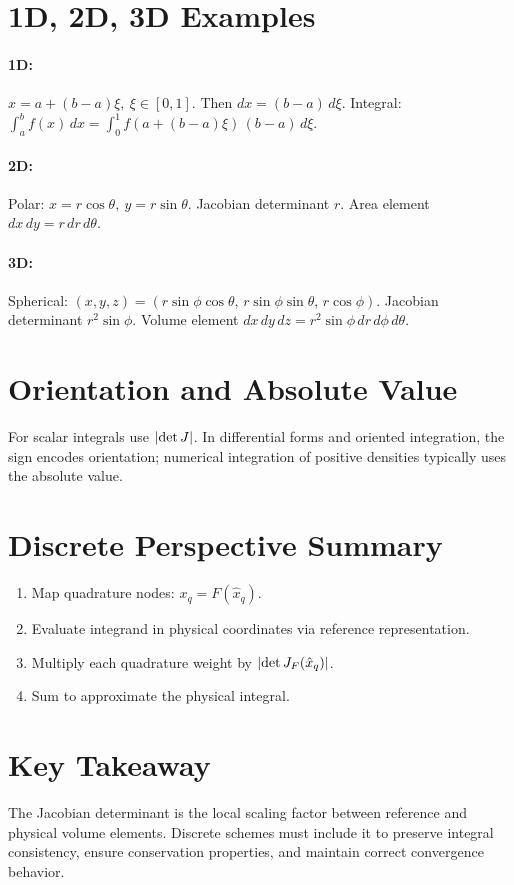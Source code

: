 \documentclass[11pt]{article}
\begin{document}
\section{1D, 2D, 3D Examples}
\paragraph{1D:} \( x = a + (b-a)\xi,\ \xi\in[0,1]. \) Then \( dx = (b-a)\, d\xi \). Integral:
\(
\int_a^b f(x)\, dx = \int_0^1 f(a+(b-a)\xi)\, (b-a)\, d\xi.
\)

\paragraph{2D:} Polar: \( x = r\cos\theta,\ y = r\sin\theta\). Jacobian determinant \( r\). Area element \( dx\,dy = r\, dr\, d\theta\).

\paragraph{3D:} Spherical: \( (x,y,z)= (r\sin\phi\cos\theta,\, r\sin\phi\sin\theta,\, r\cos\phi)\). Jacobian determinant \( r^2 \sin\phi\). Volume element \( dx\,dy\,dz = r^2 \sin\phi\, dr\, d\phi\, d\theta\).

\section{Orientation and Absolute Value}
For scalar integrals use \(\abs{\det J}\). In differential forms and oriented integration, the sign encodes orientation; numerical integration of positive densities typically uses the absolute value.

\section{Discrete Perspective Summary}
\begin{enumerate}
  \item Map quadrature nodes: \( x_q = F(\hat x_q)\).
  \item Evaluate integrand in physical coordinates via reference representation.
  \item Multiply each quadrature weight by \( \abs{\det J_F(\hat x_q)}\).
  \item Sum to approximate the physical integral.
\end{enumerate}

\section{Key Takeaway}
The Jacobian determinant is the local scaling factor between reference and physical volume elements. Discrete schemes must include it to preserve integral consistency, ensure conservation properties, and maintain correct convergence behavior.
\end{document}
